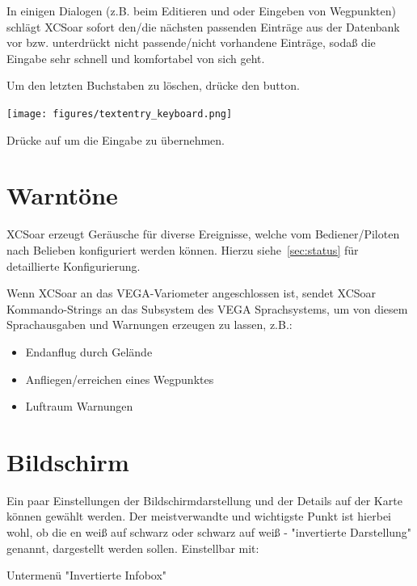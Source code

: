 \blitz In einigen Dialogen (z.B. beim Editieren und oder Eingeben von Wegpunkten) schlägt \textsf{XCSoar} sofort den/die nächsten passenden Einträge aus der Datenbank vor bzw. unterdrückt nicht passende/nicht vorhandene Einträge, sodaß die Eingabe sehr schnell und komfortabel von sich geht.

Um den letzten Buchstaben zu löschen, drücke den  \button{$<-$} button.

\begin{center}
\texttt{[image: figures/textentry\_keyboard.png]}
\end{center}

Drücke auf   um die Eingabe zu übernehmen.

\section{Warntöne}

\textsf{XCSoar} erzeugt Geräusche für diverse Ereignisse, welche vom Bediener/Piloten  nach Belieben konfiguriert werden können.
Hierzu siehe~\ref{sec:status} für detaillierte Konfigurierung.

Wenn \textsf{XCSoar} an das VEGA-Variometer angeschlossen ist,  sendet \textsf{XCSoar} Kommando-Strings an das Subsystem des VEGA Sprachsystems, um von diesem Sprachausgaben und Warnungen erzeugen zu lassen, z.B.:

\begin{itemize}
\item Endanflug durch Gelände
\item Anfliegen/erreichen eines Wegpunktes
\item Luftraum Warnungen
\end{itemize}

\section{Bildschirm}

Ein paar Einstellungen der Bildschirmdarstellung und der Details auf der Karte können gewählt werden.  Der meistverwandte und wichtigste Punkt ist hierbei wohl, ob die {\InfoBox}en weiß auf schwarz oder schwarz auf weiß - "invertierte Darstellung" genannt, dargestellt werden sollen. Einstellbar mit: 
\begin{quote}
\blink{}\blink{}
\end{quote}  Untermenü "Invertierte Infobox"

